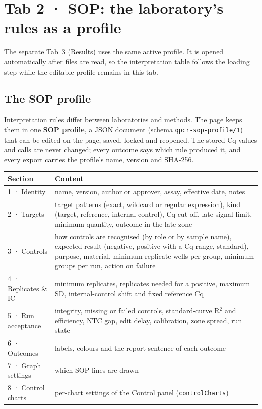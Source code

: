 \chapter{Tab 2 · SOP: the laboratory's rules as a profile}\label{ch:sop}

The separate Tab~3 (Results) uses the same active profile. It is opened automatically after files are read, so the
interpretation table follows the loading step while the editable profile remains in this tab.

\section{The SOP profile}
Interpretation rules differ between laboratories and methods. The page keeps them in one \textbf{SOP profile}, a JSON document
(schema \texttt{qpcr-sop-profile/1}) that can be edited on the page, saved, locked and reopened. The stored Cq values and calls
are never changed; every outcome says which rule produced it, and every export carries the profile's name, version and SHA-256.

\begin{center}\small
\begin{tabular}{@{}lp{11.6cm}@{}}\toprule
Section & Content\\\midrule
1 · Identity & name, version, author or approver, assay, effective date, notes\\
2 · Targets & target patterns (exact, wildcard or regular expression), kind (target, reference, internal control), Cq cut-off, late-signal limit, minimum quantity, outcome in the late zone\\
3 · Controls & how controls are recognised (by role or by sample name), expected result (negative, positive with a Cq range, standard), purpose, material, minimum replicate wells per group, minimum groups per run, action on failure\\
4 · Replicates \& IC & minimum replicates, replicates needed for a positive, maximum SD, internal-control shift and fixed reference Cq\\
5 · Run acceptance & integrity, missing or failed controls, standard-curve R$^2$ and efficiency, NTC gap, edit delay, calibration, zone spread, run state\\
6 · Outcomes & labels, colours and the report sentence of each outcome\\
7 · Graph settings & which SOP lines are drawn\\
8 · Control charts & per-chart settings of the Control panel (\texttt{controlCharts})\\\bottomrule
\end{tabular}
\end{center}

